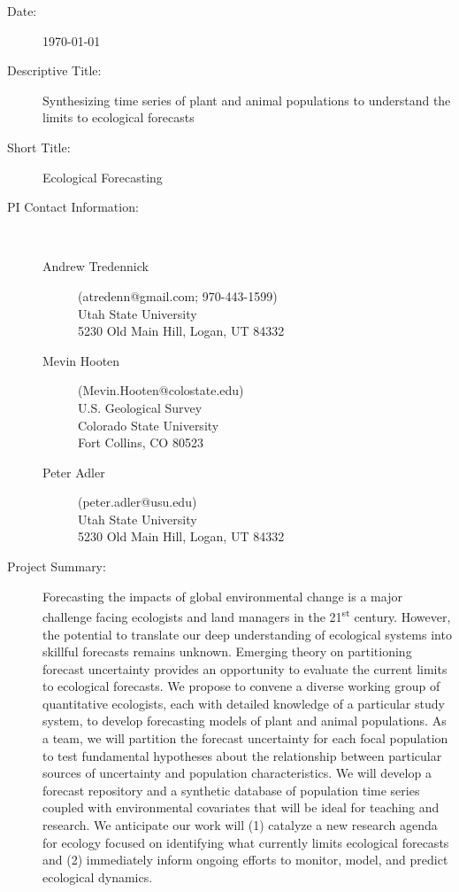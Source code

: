 \documentclass[12pt,]{article}
\title{}
\author{}
\date{}
\begin{document}
 \newcommand{\new}{\textcolor{blue}}


\begin{description}
\item[Date:] \today
\item[Descriptive Title:] Synthesizing time series of plant and animal populations to understand the limits to ecological forecasts
\item[Short Title:] Ecological Forecasting
\item[PI Contact Information:] ~\\
\vspace{-1.5em}
\begin{description}
 \item[\textcolor{mycol}{Andrew Tredennick}] (atredenn@gmail.com; 970-443-1599) \\ Utah State University \\ 5230 Old Main Hill, Logan, UT 84332
 \item[\textcolor{mycol}{Mevin Hooten}] (Mevin.Hooten@colostate.edu) \\ U.S. Geological Survey \\ Colorado State University \\ Fort Collins, CO 80523
 \item[\textcolor{mycol}{Peter Adler}] (peter.adler@usu.edu) \\ Utah State University \\ 5230 Old Main Hill, Logan, UT 84332
\end{description}
\item[Project Summary:] Forecasting the impacts of global environmental change is a major challenge facing ecologists and land managers in the 21\textsuperscript{st} century. However, the potential to translate our deep understanding of ecological systems into skillful forecasts remains unknown. Emerging theory on partitioning forecast uncertainty provides an opportunity to evaluate the current limits to ecological forecasts. We propose to convene a diverse working group of quantitative ecologists, each with detailed knowledge of a particular study system, to develop forecasting models of plant and animal populations. As a team, we will partition the forecast uncertainty for each focal population to test fundamental hypotheses about the relationship between particular sources of uncertainty and population characteristics. We will develop a forecast repository and a synthetic database of population time series coupled with environmental covariates that will be ideal for teaching and research. We anticipate our work will (1) catalyze a new research agenda for ecology focused on identifying what currently limits ecological forecasts and (2) immediately inform ongoing efforts to monitor, model, and predict ecological dynamics.

\end{description}
\end{document}
